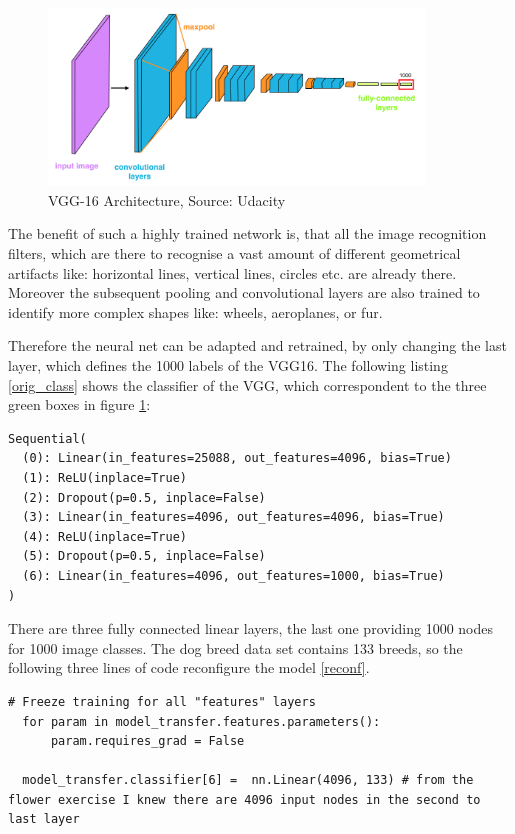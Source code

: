 \documentclass[paper=A4, DIV=10, parskip=half]{scrartcl}
\begin{document}
\begin{figure}[H]
  \centering
  \includegraphics[width=10cm]{images/vgg_16_architecture.png}
  \caption{VGG-16 Architecture, Source: Udacity}
  \label{vgg16arch}
\end{figure}

The benefit of such a highly trained network is, that all the image recognition
filters, which are there to recognise a vast amount of different geometrical
artifacts like: horizontal lines, vertical lines, circles etc. are already
there. Moreover the subsequent pooling and convolutional layers are also trained
to identify more complex shapes like: wheels, aeroplanes, or fur.

Therefore the neural net can be adapted and retrained, by only changing the last
layer, which defines the 1000 labels of the VGG16. The following listing
\ref{orig_class} shows the classifier of the VGG, which correspondent to the
three green boxes in figure \ref{vgg16arch}:

\begin{lstlisting}[caption=Original VGG16 Classifier, label=orig_class]
Sequential(
  (0): Linear(in_features=25088, out_features=4096, bias=True)
  (1): ReLU(inplace=True)
  (2): Dropout(p=0.5, inplace=False)
  (3): Linear(in_features=4096, out_features=4096, bias=True)
  (4): ReLU(inplace=True)
  (5): Dropout(p=0.5, inplace=False)
  (6): Linear(in_features=4096, out_features=1000, bias=True)
)
\end{lstlisting}

There are three fully connected linear layers, the last one providing 1000 nodes
for 1000 image classes. The dog breed data set contains 133 breeds, so the
following three lines of code reconfigure the model \ref{reconf}.

\begin{lstlisting}[caption=Adapting VGG16 Classifier, label=reconf]
  # Freeze training for all "features" layers
  for param in model_transfer.features.parameters():
      param.requires_grad = False
  
  model_transfer.classifier[6] =  nn.Linear(4096, 133) # from the flower exercise I knew there are 4096 input nodes in the second to last layer
\end{lstlisting}
\end{document}

